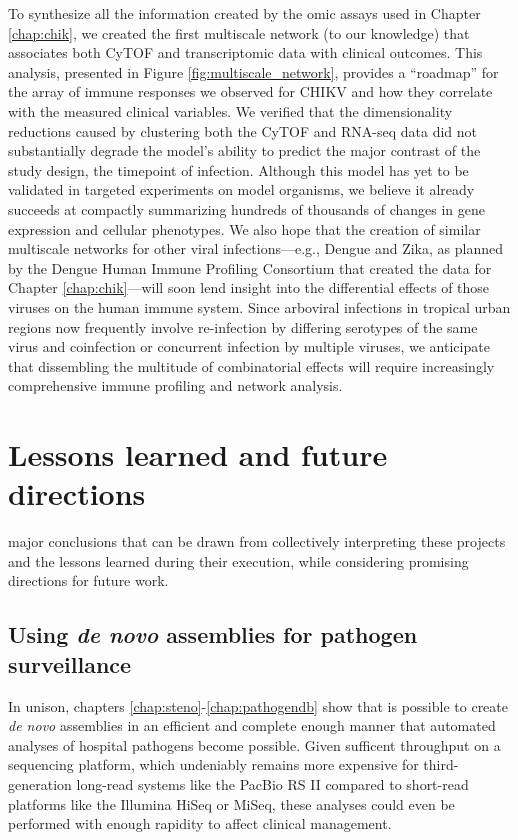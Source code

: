 To synthesize all the information created by the omic assays used in Chapter \ref{chap:chik}, we created the first multiscale network (to our knowledge) that associates both CyTOF and transcriptomic data with clinical outcomes. This analysis, presented in Figure \ref{fig:multiscale_network}, provides a ``roadmap'' for the array of immune responses we observed for CHIKV and how they correlate with the measured clinical variables. We verified that the dimensionality reductions caused by clustering both the CyTOF and RNA-seq data did not substantially degrade the model's ability to predict the major contrast of the study design, the timepoint of infection. Although this model has yet to be validated in targeted experiments on model organisms, we believe it already succeeds at compactly summarizing hundreds of thousands of changes in gene expression and cellular phenotypes. We also hope that the creation of similar multiscale networks for other viral infections—e.g., Dengue and Zika, as planned by the Dengue Human Immune Profiling Consortium that created the data for Chapter \ref{chap:chik}—will soon lend insight into the differential effects of those viruses on the human immune system. Since arboviral infections in tropical urban regions now frequently involve re-infection by differing serotypes of the same virus\autocite{OhAinle2011} and coinfection or concurrent infection by multiple viruses,\autocite{Waggoner2016} we anticipate that dissembling the multitude of combinatorial effects will require increasingly comprehensive immune profiling and network analysis.

\section{Lessons learned and future directions}

 major conclusions that can be drawn from collectively interpreting these projects and the lessons learned during their execution, while considering promising directions for future work.

\subsection{Using \emph{de novo} assemblies for pathogen surveillance}

In unison, chapters \ref{chap:steno}-\ref{chap:pathogendb} show that is possible to create \emph{de novo} assemblies in an efficient and complete enough manner that automated analyses of hospital pathogens become possible. Given sufficent throughput on a sequencing platform, which undeniably remains more expensive for third-generation long-read systems like the PacBio RS II compared to short-read platforms like the Illumina HiSeq or MiSeq, these analyses could even be performed with enough rapidity to affect clinical management.

